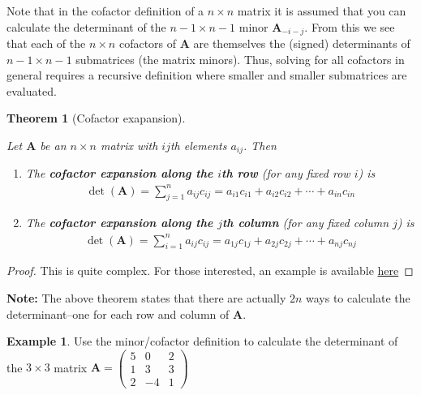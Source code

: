\documentclass[
]{book}
\newtheorem{theorem}{Theorem}[chapter]
\theoremstyle{definition}
\theoremstyle{definition}
\newtheorem{example}{Example}[chapter]
\theoremstyle{definition}
\theoremstyle{definition}
\theoremstyle{remark}
\begin{document}
Note that in the cofactor definition of a \(n \times n\) matrix it is assumed that you can calculate the determinant of the \(n-1 \times n-1\) minor \(\mathbf{A}_{-i-j}\). From this we see that each of the \(n \times n\) cofactors of \(\mathbf{A}\) are themselves the (signed) determinants of \(n-1 \times n-1\) submatrices (the matrix minors). Thus, solving for all cofactors in general requires a recursive definition where smaller and smaller submatrices are evaluated.

\begin{theorem}[Cofactor exapansion]
\protect\hypertarget{thm:cofactor-expansion}{}\label{thm:cofactor-expansion}

Let \(\mathbf{A}\) be an \(n \times n\) matrix with \(ij\)th elements \(a_{ij}\). Then

\begin{enumerate}
\def\labelenumi{\alph{enumi})}
\item
  The \textbf{cofactor expansion along the \(i\)th row} (for any fixed row \(i\)) is
  \[
  \begin{aligned}
  \det(\mathbf{A}) = \sum_{j=1}^n a_{ij} c_{ij} = a_{i1} c_{i1} + a_{i2} c_{i2} + \cdots + a_{in} c_{in}
  \end{aligned}
  \]
\item
  The \textbf{cofactor expansion along the \(j\)th column} (for any fixed column \(j\)) is
  \[
  \begin{aligned}
  \det(\mathbf{A}) = \sum_{i=1}^n a_{ij} c_{ij} = a_{1j} c_{1j} + a_{2j} c_{2j} + \cdots + a_{nj} c_{nj}
  \end{aligned}
  \]
\end{enumerate}

\end{theorem}

\begin{proof}
This is quite complex. For those interested, an example is available \href{https://textbooks.math.gatech.edu/ila/determinants-cofactors.html}{here}
\end{proof}

\textbf{Note:}
The above theorem states that there are actually \(2n\) ways to calculate the determinant--one for each row and column of \(\mathbf{A}\).

\begin{example}
Use the minor/cofactor definition to calculate the determinant of the \(3 \times 3\) matrix \(\mathbf{A} = \begin{pmatrix} 5 & 0 & 2 \\ 1 & 3 & 3 \\ 2 & -4 & 1 \end{pmatrix}\)
\end{example}
\end{document}
